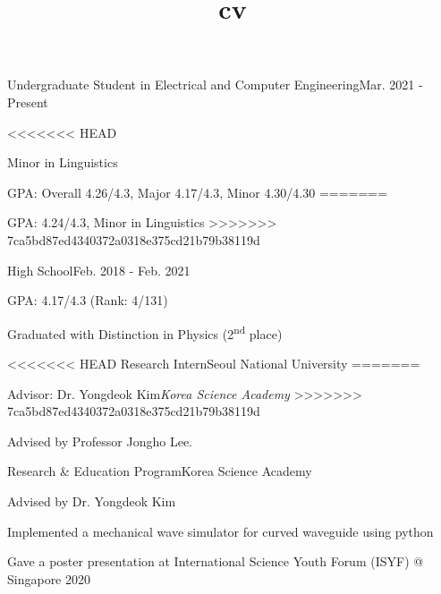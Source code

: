 \documentclass{cv}
\title{cv}
\begin{document}
\cvheader






{Undergraduate Student in Electrical and Computer Engineering}{Mar. 2021 - Present}
{
<<<<<<< HEAD
    \item Minor in Linguistics
    \item GPA: Overall 4.26/4.3, Major 4.17/4.3, Minor 4.30/4.30
=======
    \item GPA: 4.24/4.3, Minor in Linguistics
>>>>>>> 7ca5bd87ed4340372a0318e375cd21b79b38119d
}
{High School}{Feb. 2018 - Feb. 2021}
{
    \item GPA: 4.17/4.3 (Rank: 4/131) 
    \item Graduated with Distinction in Physics (2\textsuperscript{nd} place)
}


<<<<<<< HEAD
{Research Intern}{Seoul National University}
=======


\begin{comment}
\cvsection{Research Experiences}

\cventry{Laboratory of Imaging Science and Technology (LIST)}{2022}
{Research Intern}{\textit{Seoul National University}}
{
    \item 
}
\end{comment}


{Advisor: Dr. Yongdeok Kim}{\textit{Korea Science Academy}}
>>>>>>> 7ca5bd87ed4340372a0318e375cd21b79b38119d
{
    \item Advised by Professor Jongho Lee.
}

{Research \& Education Program}{Korea Science Academy}
{
    \item Advised by Dr. Yongdeok Kim
    \item Implemented a mechanical wave simulator for curved waveguide using python %
    \item Gave a poster presentation at International Science Youth Forum (ISYF) @ Singapore 2020
}
\end{document}
